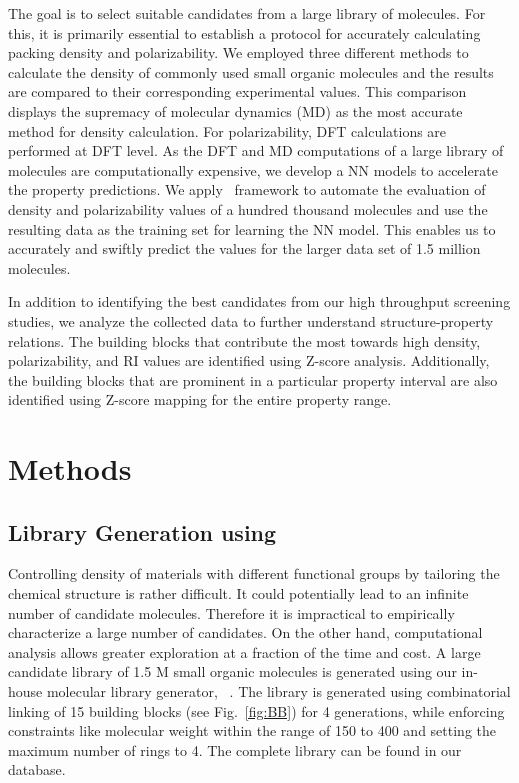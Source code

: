 The goal is to select suitable candidates from a large library of molecules. For this, it is primarily essential to establish a protocol for accurately calculating packing density and polarizability. We employed three different methods to calculate the density of commonly used small organic molecules and the results are compared to their corresponding experimental values. This comparison displays the supremacy of molecular dynamics (MD) as the most accurate method for density calculation. For polarizability, DFT calculations are performed at DFT level. As the DFT and MD computations of a large library of molecules are computationally expensive, we develop a NN models to accelerate the property predictions. We apply \chemhtps\ framework to automate the evaluation of density and polarizability values of a hundred thousand molecules and use the resulting data as the training set for learning the NN model. This enables us to accurately and swiftly predict the values for the larger data set of 1.5 million molecules.

In addition to identifying the best candidates from our high throughput screening studies, we analyze the collected data to further understand structure-property relations. The building blocks that contribute the most towards high density, polarizability, and RI values are identified using Z-score analysis. Additionally, the building blocks that are prominent in a particular property interval are also identified using Z-score mapping for the entire property range. 



\section{Methods}
\label{sec:methods6}

\subsection{Library Generation using \chemlg}
\label{chemhtps6}

Controlling density of materials with different functional groups by tailoring the chemical structure is rather difficult. It could potentially lead to an infinite number of candidate molecules. Therefore it is impractical to empirically characterize a large number of candidates. On the other hand, computational analysis allows greater exploration at a fraction of the time and cost. A large candidate library of 1.5 M small organic molecules is generated using our in-house molecular library generator, \chemlg\ \cite{Afzal2018b}. The library is generated using combinatorial linking of 15 building blocks (see Fig.\ \ref{fig:BB}) for 4 generations, while enforcing constraints like molecular weight within the range of 150 to 400 and setting the maximum number of rings to 4. The complete library can be found in our database. 

